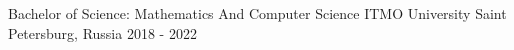 

\begin{cventries}


  \cventry
    {Bachelor of Science: Mathematics And Computer Science} %
    {ITMO University} %
    {Saint Petersburg, Russia} %
    {2018 - 2022} %
    {
    }

\end{cventries}
